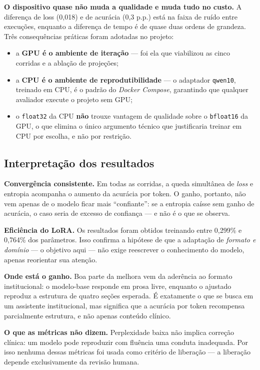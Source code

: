 \documentclass[12pt,a4paper]{article}
\begin{document}
\noindent\textbf{O dispositivo quase não muda a qualidade e muda tudo no custo.}
A diferença de loss (0,018) e de acurácia (0,3 p.p.) está na faixa de ruído entre
execuções, enquanto a diferença de tempo é de quase duas ordens de grandeza. Três
consequências práticas foram adotadas no projeto:

\begin{itemize}[leftmargin=*]
  \item a \textbf{GPU é o ambiente de iteração} --- foi ela que viabilizou as
        cinco corridas e a ablação de projeções;
  \item a \textbf{CPU é o ambiente de reprodutibilidade} --- o adaptador
        \texttt{qwen10}, treinado em CPU, é o padrão do \emph{Docker Compose},
        garantindo que qualquer avaliador execute o projeto sem GPU;
  \item o \texttt{float32} da CPU \textbf{não} trouxe vantagem de qualidade sobre
        o \texttt{bfloat16} da GPU, o que elimina o único argumento técnico que
        justificaria treinar em CPU por escolha, e não por restrição.
\end{itemize}

\subsection{Interpretação dos resultados}

\noindent\textbf{Convergência consistente.} Em todas as corridas, a queda
simultânea de \emph{loss} e entropia acompanha o aumento da acurácia por token.
O ganho, portanto, não vem apenas de o modelo ficar mais ``confiante'': se a
entropia caísse sem ganho de acurácia, o caso seria de excesso de confiança --- e
não é o que se observa.

\medskip
\noindent\textbf{Eficiência do LoRA.} Os resultados foram obtidos treinando entre
0,299\% e 0,764\% dos parâmetros. Isso confirma a hipótese de que a adaptação de
\emph{formato e domínio} --- o objetivo aqui --- não exige reescrever o
conhecimento do modelo, apenas reorientar sua atenção.

\medskip
\noindent\textbf{Onde está o ganho.} Boa parte da melhora vem da aderência ao
formato institucional: o modelo-base responde em prosa livre, enquanto o ajustado
reproduz a estrutura de quatro seções esperada. É exatamente o que se busca em um
assistente institucional, mas significa que a acurácia por token recompensa
parcialmente estrutura, e não apenas conteúdo clínico.

\medskip
\noindent\textbf{O que as métricas não dizem.} Perplexidade baixa não implica
correção clínica: um modelo pode reproduzir com fluência uma conduta inadequada.
Por isso nenhuma dessas métricas foi usada como critério de liberação --- a
liberação depende exclusivamente da revisão humana.
\end{document}
